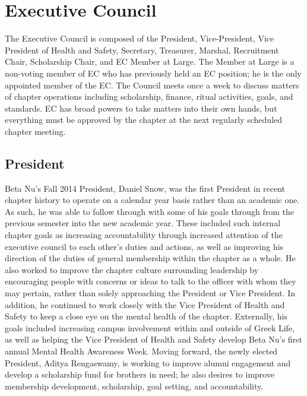     \section*{Executive Council}
      The Executive Council is composed of the President, Vice-President, Vice President of Health and Safety, Secretary, Treasurer, Marshal, Recruitment Chair, Scholarship Chair, and EC Member at Large. The Member at Large is a non-voting member of EC who has previously held an EC position; he is the only appointed member of the EC. The Council meets once a week to discuss matters of chapter operations including scholarship, finance, ritual activities, goals, and standards. EC has broad powers to take matters into their own hands, but everything must be approved by the chapter at the next regularly scheduled chapter meeting.
      
      \subsection*{President}
	Beta Nu's Fall 2014 President, Daniel Snow, was the first President in recent chapter history to operate on a calendar year basis rather than an academic one. As such, he was able to follow through with some of his goals through from the previous semester into the new academic year. These included such internal chapter goals as increasing accountability through increased attention of the executive council to each other's duties and actions, as well as improving his direction of the duties of general membership within the chapter as a whole. He also worked to improve the chapter culture surrounding leadership by encouraging people with concerns or ideas to talk to the officer with whom they may pertain, rather than solely approaching the President or Vice President. In addition, he continued to work closely with the Vice President of Health and Safety to keep a close eye on the mental health of the chapter. Externally, his goals included increasing campus involvement within and outside of Greek Life, as well as helping the Vice President of Health and Safety develop Beta Nu's first annual Mental Health Awareness Week. Moving forward, the newly elected President, Aditya Rengaswamy, is working to improve alumni engagement and develop a scholarship fund for brothers in need; he also desires to improve membership development, scholarship, goal setting, and accountability.
	
